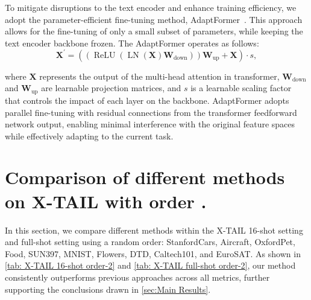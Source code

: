 \documentclass{article}
\theoremstyle{plain}
\theoremstyle{definition}
\theoremstyle{remark}
\begin{document}
To mitigate disruptions to the text encoder and enhance training efficiency, we adopt the parameter-efficient fine-tuning method, AdaptFormer~\cite{chen2022adaptformer}. This approach allows for the fine-tuning of only a small subset of parameters, while keeping the text encoder backbone frozen. The AdaptFormer operates as follows:
\begin{equation}
    \boldsymbol{X}^\prime =
    \left(\left(\operatorname{ReLU} \left(\operatorname{LN} \left(\boldsymbol{X}\right) \boldsymbol{W}_{\text{down}}\right)\right) \boldsymbol{W}_{\text{up}} + \boldsymbol{X}\right) \cdot s ,
\end{equation}

where $\boldsymbol{X}$ represents the output of the multi-head attention in transformer, $\boldsymbol{W}_{\text{down}}$ and $\boldsymbol{W}_{\text{up}}$ are learnable projection matrices, and $s$ is a learnable scaling factor that controls the impact of each layer on the backbone. AdaptFormer adopts parallel fine-tuning with residual connections from the transformer feedforward network output, enabling minimal interference with the original feature spaces while effectively adapting to the current task.

\section{Comparison of different methods on X-TAIL with order \MakeUppercase{}.}
\label{sec: X-TAIL order-2}

In this section, we compare different methods within the X-TAIL 16-shot setting and full-shot setting using a random order: StanfordCars, Aircraft, OxfordPet, Food, SUN397, MNIST, Flowers, DTD, Caltech101, and EuroSAT. As shown in \cref{tab: X-TAIL 16-shot order-2} and \cref{tab: X-TAIL full-shot order-2}, our method consistently outperforms previous approaches across all metrics, further supporting the conclusions drawn in \cref{sec:Main Results}.
\end{document}
